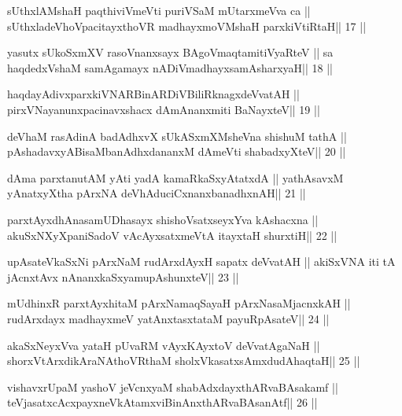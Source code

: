 \begin{shl}
sUthxlAMshaH paqthiviVmeVti puriVSaM mUtarxmeVva ca ||
sUthxladeVhoVpacitayxthoVR madhayxmoVM\s shaH parxkiVtiRtaH\hfill || 17 ||
\end{shl}

\begin{shl}
yasutx sUkoSxmXV rasoV\s nanxsayx BAgoV\s maqtamitiVyaRteV ||
sa haqdedxVshaM samAgamayx nADiVmadhayxsamAsharxyaH\hfill || 18 ||
\end{shl}

\begin{shl}
haqdayAdivxparxkiVNARBinARDiVBiliRknagxdeVvatAH ||
pirxVNayanunxpacinavxshacx dAmAnanxmiti BaNayxteV\hfill || 19 ||
\end{shl}

\begin{shl}
deVhaM rasAdinA badAdhxvX sUkASxmXMsheVna shishuM tathA ||
pAshadavxyABisaMbanAdhxdananxM dAmeVti shabadxyXteV\hfill || 20 ||
\end{shl}

\begin{shl}
dAma parxtanutAM yAti yadA kamaRkaSxyAtatxdA ||
yathAsavxM yAnatxyXtha pArxNA deVhAduciCxnanxbanadhxnAH\hfill || 21 ||
\end{shl}

\begin{shl}
parxtAyxdhAnasamUDhasayx shishoVsatxseyxYva kAshacxna ||
akuSxNXyXpaniSadoV vAcAyxsatxmeVtA itayxtaH shurxtiH\hfill || 22 ||
\end{shl}

\begin{shl}
upAsateV\s kaSxNi pArxNaM rudArxdAyxH sapatx deVvatAH ||
akiSxVNA iti tA jAcnxtAvx nAnanxkaSxyamupAshunxteV\hfill || 23 ||
\end{shl}

\begin{shl}
mUdhinxR parxtAyxhitaM pArxNamaqSayaH pArxNasaMjacnxkAH ||
rudArxdayx madhayxmeV yatAnxtasxtataM payuRpAsateV\hfill || 24 ||
\end{shl}

\begin{shl}
akaSxNeyxVva yataH pUvaRM vAyxKAyxtoV deVvatAgaNaH ||
shorxVtArxdikAraNAthoVR\s thaM sholxVkasatxsAmxdudAhaqtaH\hfill || 25 ||
\end{shl}

\begin{shl}
vishavxrUpaM yashoV jeVcnxyaM shabAdxdayxthARvaBAsakamf ||
teVjasatxcAcxpayxneVkAtamxviBinAnxthARvaBAsanAtf\hfill || 26 ||
\end{shl}


